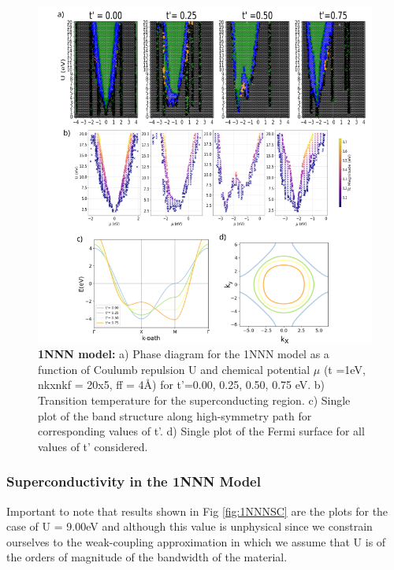 \documentclass[12pt]{article}
\begin{document}
\begin{figure}[htbp]  %
    \centering
    \includegraphics[width=1.0\textwidth]{1NNN.png}  %
    \caption{\textbf{1NNN model:} a) Phase diagram for the 1NNN model as a function of Coulumb repulsion U and chemical potential $\mu$ (t =1eV, nkxnkf = 20x5, ff = 4\AA) for t'=0.00, 0.25, 0.50, 0.75 eV. 
    b) Transition temperature for the superconducting region.
    c) Single plot of the band structure along high-symmetry path for corresponding values of t'.
    d) Single plot of the Fermi surface for all values of t' considered.}
    
    \label{fig:1NNN}
\end{figure}

\newpage

\subsubsection{Superconductivity in the 1NNN Model}

Important to note that results shown in Fig \ref{fig:1NNNSC} are the plots for the case of U = 9.00eV and although this
value is unphysical since we constrain ourselves to the weak-coupling approximation in which we assume that U is of the orders of
magnitude of the bandwidth of the material. 
\end{document}
